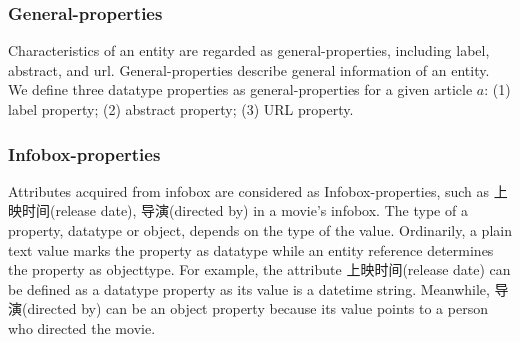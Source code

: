 \documentclass[runningheads,a4paper]{llncs}
\begin{document}
\begin{CJK*}{UTF8}{song}
\subsubsection{General-properties}
Characteristics of an entity are regarded as general-properties, including label, abstract, and url. General-properties describe general information of an entity. We define three datatype properties as general-properties for a given article $a$: (1) label property; (2) abstract property; (3) URL property.

\subsubsection{Infobox-properties}
Attributes acquired from infobox are considered as Infobox-properties, such as 上映时间(release date), 导演(directed by) in a movie's infobox. The type of a property, datatype or object, depends on the type of the value. Ordinarily, a plain text value marks the property as datatype while an entity reference determines the property as objecttype. For example, the attribute 上映时间(release date) can be defined as a datatype property as its value is a datetime string. Meanwhile, 导演(directed by) can be an object property because its value points to a person who directed the movie.


\end{CJK*}
\end{document}
